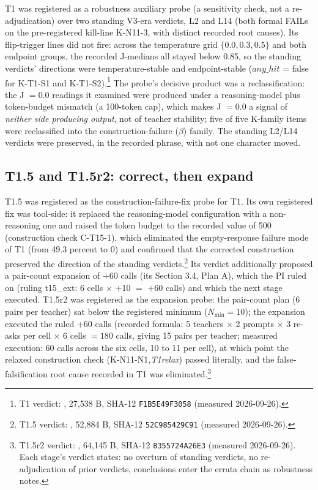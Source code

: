 \documentclass[11pt]{article}
\newcommand{\sha}[1]{\texttt{#1}}
\begin{document}
T1 was registered as a robustness auxiliary probe (a sensitivity check, not a re-adjudication) over two standing V3-era verdicts, L2 and L14 (both formal FAILs on the pre-registered kill-line K-N11-3, with distinct recorded root causes). Its flip-trigger lines did not fire: across the temperature grid $\{0.0, 0.3, 0.5\}$ and both endpoint groups, the recorded J-medians all stayed below 0.85, so the standing verdicts' directions were temperature-stable and endpoint-stable ($any\_hit$ = false for K-T1-S1 and K-T1-S2).\footnote{T1 verdict: , 27{,}538 B, SHA-12 \sha{F1B5E49F3058} (measured 2026-09-26).} The probe's decisive product was a reclassification: the J $= 0.0$ readings it examined were produced under a reasoning-model plus token-budget mismatch (a 100-token cap), which makes J $= 0.0$ a signal of \emph{neither side producing output}, not of teacher stability; five of five K-family items were reclassified into the construction-failure ($\beta$) family. The standing L2/L14 verdicts were preserved, in the recorded phrase, with not one character moved.

\subsection{T1.5 and T1.5r2: correct, then expand}

T1.5 was registered as the construction-failure-fix probe for T1. Its own registered fix was tool-side: it replaced the reasoning-model configuration with a non-reasoning one and raised the token budget to the recorded value of 500 (construction check C-T15-1), which eliminated the empty-response failure mode of T1 (from 49.3 percent to 0) and confirmed that the corrected construction preserved the direction of the standing verdicts.\footnote{T1.5 verdict: , 52{,}884 B, SHA-12 \sha{52C985429C91} (measured 2026-09-26).} Its verdict additionally proposed a pair-count expansion of +60 calls (its Section 3.4, Plan A), which the PI ruled on (ruling t15\_ext: 6 cells $\times$ +10 $=$ +60 calls) and which the next stage executed. T1.5r2 was registered as the expansion probe: the pair-count plan (6 pairs per teacher) sat below the registered minimum ($N_{\min} = 10$); the expansion executed the ruled +60 calls (recorded formula: 5 teachers $\times$ 2 prompts $\times$ 3 re-asks per cell $\times$ 6 cells $= 180$ calls, giving 15 pairs per teacher; measured execution: 60 calls across the six cells, 10 to 11 per cell), at which point the relaxed construction check (K-N11-N1\emph{,T1relax}) passed literally, and the false-falsification root cause recorded in T1 was eliminated.\footnote{T1.5r2 verdict: , 64{,}145 B, SHA-12 \sha{8355724A26E3} (measured 2026-09-26). Each stage's verdict states: no overturn of standing verdicts, no re-adjudication of prior verdicts, conclusions enter the errata chain as robustness notes.}
\end{document}
